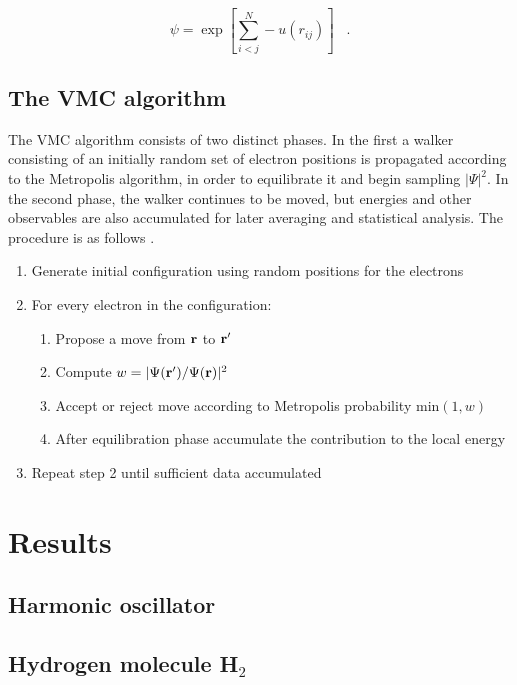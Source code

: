 \documentclass{article}
\begin{document}
\begin{equation}
\psi=\exp \left[ \sum_{i<j}^{N} -u(r_{ij}) \right] \;\;\;.
\end{equation}

\subsection{The VMC algorithm}
The VMC algorithm consists of two distinct phases. In the first a walker consisting of an initially random set of electron positions is propagated according to the Metropolis algorithm, in order to equilibrate it and begin sampling $\vert\Psi\vert^2$. In the second phase, the walker continues to be moved, but energies and other observables are also accumulated for later averaging and statistical analysis. The procedure is as follows \citep{thijssen2007computational}.

  \begin{enumerate}
    \item Generate initial configuration using random positions for the electrons
    \item For every electron in the configuration:
    \begin{enumerate}
     \item Propose a move from ${\bf r}$ to  ${\bf r}^\prime$
     \item Compute  $w=\vert\Psi({\bf r}^\prime)/\Psi({\bf r})\vert^2$
     \item Accept or reject move according to Metropolis probability $\mathrm{min}(1,w)$
     \item After equilibration phase accumulate the contribution to the local energy
    \end{enumerate}
    \item Repeat step 2 until sufficient data accumulated 
  \end{enumerate}

\section{Results}
\subsection{Harmonic oscillator}

\subsection{Hydrogen molecule H$_2$}
\end{document}
